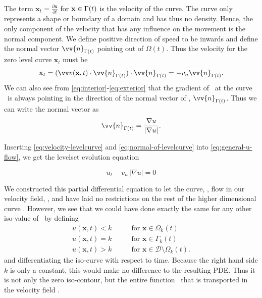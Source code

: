 The term $\mathbf{x}_t=\frac{\partial \mathbf{x}}{\partial t}$ for $\mathbf{x} \in \Gamma (t)$ is the velocity of the curve. The curve only represents a shape or boundary of a domain and has thus no density. Hence, the only component of the velocity that has any influence on the movement is the normal component. We define positive direction of speed to be inwards and define the normal vector $\vv{n}_{\curvem}$ pointing out of $\Omega(t)$. Thus the velocity for the zero level curve $\mathbf{x}_t$ must be
\begin{equation}
    \mathbf{x}_t = (\velocityfieldm \cdot \vv{n}_{\curvem})\cdot \vv{n}_{\curvem}= -v_n \vv{n}_{\curvem}.
    \label{eq:velocity-levelcurve}
\end{equation}
We can also see from \eqref{eq:interior}-\eqref{eq:exterior} that the gradient of \uxt\ at the curve \curve\ is always pointing in the direction of the normal vector of \curve, $\vv{n}_{\curvem}$. Thus we can write the normal vector as
\begin{equation}
    \vv{n}_{\curvem} = \frac{\nabla u}{|\nabla u|}.
    \label{eq:normal-of-levelcurve}
\end{equation}

Inserting \eqref{eq:velocity-levelcurve} and \eqref{eq:normal-of-levelcurve} into \eqref{eq:general-u-flow}, we get the levelset evolution equation 

\begin{tcolorbox}[title=The level set evolution equation]
\begin{equation}
    u_t - v_n\, |\nabla u| = 0
    \label{eq:general-level-set}
\end{equation}
\end{tcolorbox}

We constructed this partial differential equation to let the curve, \curve, flow in 
our velocity field, \velocityfield, and have laid no restrictions on the rest of the higher dimensional curve
\uxt. However, we see that we could have done exactly the same for 
any other iso-value of \uxt\ by defining 
\begin{align*}
    u(\mathbf{x}, t) < k \qquad &\text{for } \mathbf{x} \in  \Omega_k(t) \\
    u(\mathbf{x}, t) = k \qquad &\text{for } \mathbf{x} \in  \Gamma_k(t) \\
    u(\mathbf{x}, t) > k \qquad &\text{for } \mathbf{x} \in  \mathcal{D} \setminus \Omega_k(t) .
\end{align*}
and differentiating the iso-curve with respect to time. Because the right hand 
side $k$ is only a constant, this would make no difference to the resulting PDE. Thus
it is not only the zero iso-contour, but the entire function \uxt\ that is transported 
in the velocity field \velocityfield.

